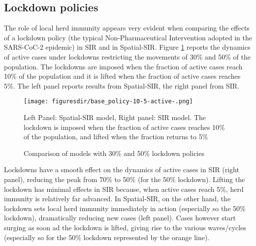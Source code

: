 \documentclass[english,11pt]{article}
\begin{document}
\subsection{Lockdown policies}\label{app:lockdowns}
The role of local herd immunity appears very evident when comparing the effects of a lockdown policy (the typical Non-Pharmaceutical Intervention adopted in the SARS-CoC-2 epidemic) in SIR and in Spatial-SIR. 
Figure \ref{fig:policy-active} reports the dynamics of active cases under lockdowns restricting the movements of 30\% and 50\% of the population. The lockdowns are imposed when the fraction of active cases reach 10\% of the population and it is lifted when the fraction of active cases reaches 5\%. The left panel reports results from Spatial-SIR, the right panel from SIR. 
\begin{figure}[H]
    \caption{Comparison of models with 30\% and 50\% lockdown policies}
    \centering
    \label{fig:policy-active}
    \begin{threeparttable}
    \texttt{[image: figuresdir/base\_policy-10-5-active-.png]}
    \begin{tablenotes}
        \footnotesize
        \setlength{\itemindent}{-0.2em}
        \item Left Panel: Spatial-SIR model, Right panel: SIR model. The lockdown is imposed when the fraction of active cases reaches 10\% of the population, and lifted when
        the fraction returns to 5\%
    \end{tablenotes}
    \end{threeparttable}
    
\end{figure}
Lockdowns have a smooth effect on the dynamics of active cases in SIR (right panel), reducing the peak from 70\% to 50\% (for the 50\% lockdown). Lifting the lockdown has minimal effects in SIR because, when active cases reach 5\%,  herd immunity is relatively far advanced. In Spatial-SIR, on the other hand,  the lockdown sets local herd immunity immediately in action (especially so the 50\% lockdown), dramatically reducing new cases (left panel). Cases however start surging as soon ad the lockdown is lifted, giving rise to the various waves/cycles  (especially so for the 50\% lockdown represented by the orange line). \newline
\end{document}
